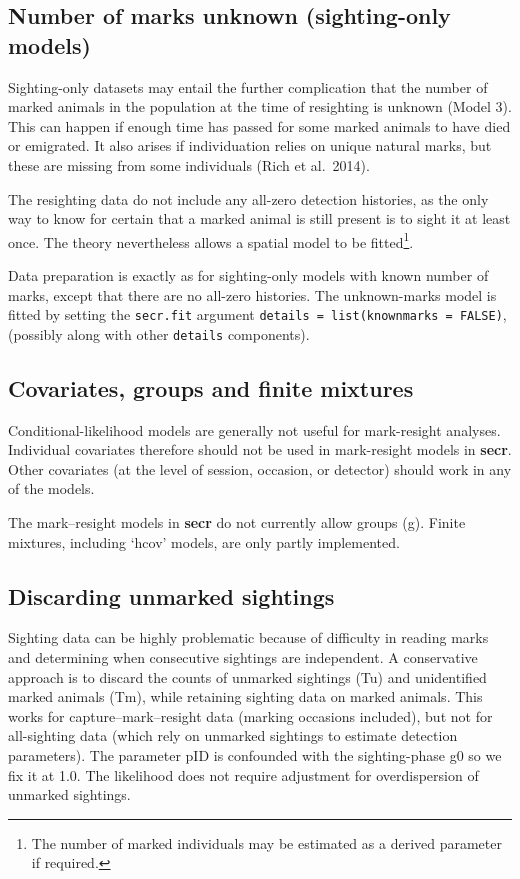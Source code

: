 \documentclass[
]{book}
\begin{document}
\subsection{Number of marks unknown (sighting-only models)}\label{unknownmarked}

Sighting-only datasets may entail the further complication that the number of marked animals in the population at the time of resighting is unknown (Model 3). This can happen if enough time has passed for some marked animals to have died or emigrated. It also arises if individuation relies on unique natural marks, but these are missing from some individuals (Rich et al.~2014).

The resighting data do not include any all-zero detection histories, as the only way to know for certain that a marked animal is still present is to sight it at least once. The theory nevertheless allows a spatial model to be fitted\footnote{The number of marked individuals may be estimated as a derived parameter if required.}.

Data preparation is exactly as for sighting-only models with known number of marks, except that there are no all-zero histories. The unknown-marks model is fitted by setting the \texttt{secr.fit} argument \texttt{details\ =\ list(knownmarks\ =\ FALSE)}, (possibly along with other \texttt{details} components).

\subsection{Covariates, groups and finite mixtures}\label{covariates-groups-and-finite-mixtures}

Conditional-likelihood models are generally not useful for mark-resight analyses. Individual covariates therefore should not be used in mark-resight models in \textbf{secr}. Other covariates (at the level of session, occasion, or detector) should work in any of the models.

The mark--resight models in \textbf{secr} do not currently allow groups (g). Finite mixtures, including `hcov' models, are only partly implemented.

\subsection{Discarding unmarked sightings}\label{discarding-unmarked-sightings}

Sighting data can be highly problematic because of difficulty in reading marks and determining when consecutive sightings are independent. A conservative approach is to discard the counts of unmarked sightings (Tu) and unidentified marked animals (Tm), while retaining sighting data on marked animals. This works for capture--mark--resight data (marking occasions included), but not for all-sighting data (which rely on unmarked sightings to estimate detection parameters). The parameter pID is confounded with the sighting-phase g0 so we fix it at 1.0. The likelihood does not require adjustment for overdispersion of unmarked sightings.
\end{document}
